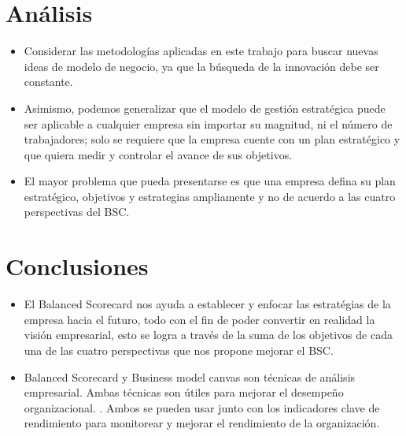 \documentclass[%
 reprint,
 amsmath,amssymb,
 aps,
]{revtex4-1}
\begin{document}
\section{Análisis}

\begin{itemize}

\item  Considerar las metodologías aplicadas en este trabajo para buscar
nuevas ideas de modelo de negocio, ya que la búsqueda de la
innovación debe ser constante.
\item Asimismo, podemos generalizar que el modelo de gestión estratégica puede ser aplicable a cualquier empresa sin importar su
magnitud, ni el número de trabajadores; solo se requiere que la empresa
cuente con un plan estratégico y que quiera medir y controlar el avance de
sus objetivos.
\item El mayor problema que pueda presentarse es que una empresa defina su
plan estratégico, objetivos y estrategias ampliamente y no de acuerdo a las
cuatro perspectivas del BSC. 
\end{itemize}
\section{Conclusiones}

\begin{itemize}
\item El Balanced Scorecard nos ayuda a establecer y enfocar las estratégias de la empresa hacia el futuro, todo con el fin de poder convertir en realidad la visión empresarial, esto se logra a través de la suma de los objetivos de cada una de las cuatro perspectivas que nos propone mejorar el BSC.

\item Balanced Scorecard y Business model canvas son técnicas de análisis empresarial. Ambas técnicas son útiles para mejorar el desempeño organizacional. . Ambos se pueden usar junto con los indicadores clave de rendimiento para monitorear y mejorar el rendimiento de la organización. 

\end{itemize}




\end{document}

